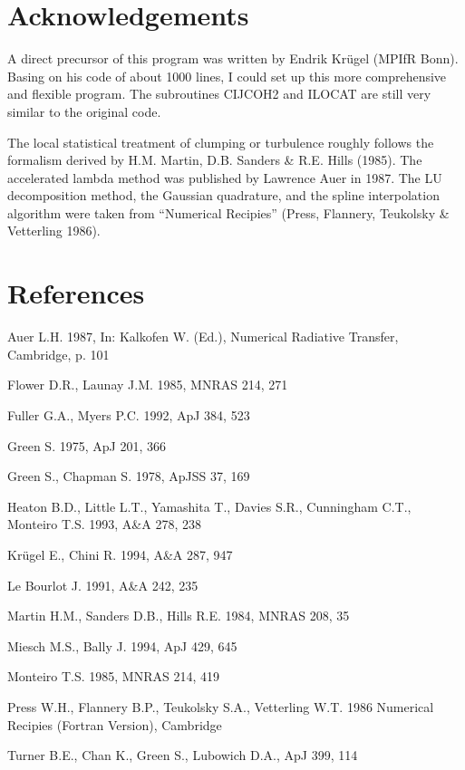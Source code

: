 \section{Acknowledgements}

A direct precursor of this program was written by Endrik Kr\"ugel 
(MPIfR Bonn). Basing on his code of about 1000 lines, I could set
up this more comprehensive and flexible program. The subroutines 
CIJCOH2 and ILOCAT are still very similar to the original code. 

The local statistical treatment of clumping or turbulence roughly 
follows the formalism derived by H.M. Martin, D.B. Sanders \& R.E. Hills
(1985).
The accelerated lambda method was published by Lawrence Auer
in 1987. The LU decomposition method, the Gaussian quadrature, and 
the spline interpolation algorithm were taken from ``Numerical Recipies''
(Press, Flannery, Teukolsky \& Vetterling 1986).

\section{References}

\begin{description}
\item{}Auer L.H. 1987, In: Kalkofen W. (Ed.), Numerical Radiative Transfer,
Cambridge, p. 101
\item{}Flower D.R., Launay J.M.  1985, MNRAS 214, 271
\item{}Fuller G.A., Myers P.C. 1992, ApJ 384, 523
\item{}Green S. 1975, ApJ 201, 366
\item{}Green S., Chapman S. 1978, ApJSS 37, 169
\item{}Heaton B.D., Little L.T., Yamashita T., Davies S.R., Cunningham C.T.,
Monteiro T.S. 1993, A\&A 278, 238
\item{}Kr\"ugel E., Chini R. 1994, A\&A 287, 947
\item{}Le Bourlot J. 1991, A\&A 242, 235
\item{}Martin H.M., Sanders D.B., Hills R.E. 1984, MNRAS 208, 35
\item{}Miesch M.S., Bally J. 1994, ApJ 429, 645
\item{}Monteiro T.S. 1985, MNRAS 214, 419
\item{}Press W.H., Flannery B.P., Teukolsky S.A., Vetterling W.T. 1986
Numerical Recipies (Fortran Version), Cambridge
\item{}Turner B.E., Chan K., Green S., Lubowich D.A., ApJ 399, 114
\end{description}


